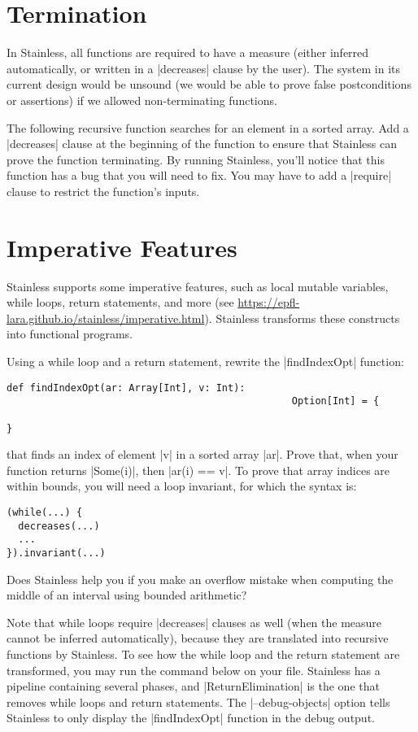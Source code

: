 \section{Termination}

In Stainless, all functions are required to have a measure (either inferred
automatically, or written in a |decreases| clause by the user). The system in
its current design would be unsound (we would be able to prove false postconditions
or assertions) if we allowed non-terminating functions.

The following recursive function searches for an element in a sorted array.
Add a |decreases| clause at the beginning of the function to ensure that
Stainless can prove the function terminating.
By running Stainless, you'll notice that this function has a bug that you will need
to fix. You may have to add a |require| clause to restrict the function's inputs.




\section{Imperative Features}

Stainless supports some imperative features, such as local mutable variables,
while loops, return statements, and more (see \url{https://epfl-lara.github.io/stainless/imperative.html}).
Stainless transforms these constructs into functional programs.

Using a while loop and a return statement, rewrite the |findIndexOpt| function:
\begin{lstlisting}
def findIndexOpt(ar: Array[Int], v: Int):
                                                 Option[Int] = {

}
\end{lstlisting}
that finds an index of element |v|
in a sorted array |ar|. Prove that, when your
function returns |Some(i)|,
then |ar(i) == v|. To prove that array indices are within bounds, you will need a
loop invariant, for which the syntax is:

\begin{lstlisting}
(while(...) {
  decreases(...)
  ...
}).invariant(...)
\end{lstlisting}
Does Stainless help you if you make an overflow mistake when computing
the middle of an interval using bounded arithmetic?

Note that while loops require |decreases| clauses as well (when the measure
cannot be inferred automatically), because they are translated into recursive
functions by Stainless.
To see how the while loop and the return statement are transformed,
you may run the command below on your file. Stainless
has a pipeline containing several phases, and |ReturnElimination| is the one
that removes while loops and return statements. The |--debug-objects| option tells
Stainless to only display the |findIndexOpt| function in the debug output.


